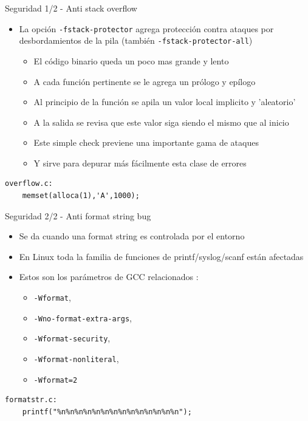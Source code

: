 \documentclass[xetex]{beamer}
\begin{document}
\begin{frame}[fragile]{Seguridad 1/2 - Anti stack overflow}
\begin{itemize}
  \item La opción \verb=-fstack-protector= agrega protección contra ataques por
desbordamientos de la pila (también \verb=-fstack-protector-all=)
\begin{itemize}
  \item El código binario queda un poco mas grande y lento
  \item A cada función pertinente se le agrega un prólogo y epílogo
  \item Al principio de la función se apila un valor local implicito y 'aleatorio'
  \item A la salida se revisa que este valor siga siendo el mismo que al inicio
  \item Este simple check previene una importante gama de ataques
  \item Y sirve para depurar más fácilmente esta clase de errores
\end{itemize}
\end{itemize}
\begin{verbatim}
overflow.c:
    memset(alloca(1),'A',1000);
\end{verbatim}
  
\end{frame}
\begin{frame}[fragile]{Seguridad 2/2 - Anti format string bug}
\begin{itemize}
  \item Se da cuando una format string es controlada por el entorno
  \item En Linux toda la familia de funciones de printf/syslog/scanf están afectadas
  \item Estos son los parámetros de GCC relacionados :
     \begin{itemize}
        \item \verb#-Wformat#, 
        \item \verb#-Wno-format-extra-args#,
        \item \verb#-Wformat-security#, 
        \item \verb#-Wformat-nonliteral#, 
        \item \verb#-Wformat=2#
     \end{itemize}
\end{itemize}
\begin{verbatim}
formatstr.c:
    printf("%n%n%n%n%n%n%n%n%n%n%n%n%n%n");
\end{verbatim}
\end{frame}
\end{document}
